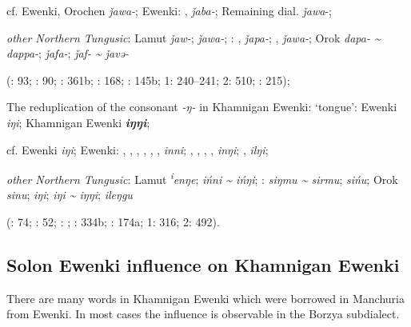 \documentclass[output=paper,colorlinks,citecolor=brown]{langscibook}
\begin{document}
    cf.  Ewenki, Orochen \textit{ǰawa-};  Ewenki: ,  \textit{ǰaba-}; Remaining dial. \textit{ǰawa}{}-;

    \textit{other Northern Tungusic}: Lamut \textit{ǰaw-};  \textit{ǰawa-}; \textit{}: ,  \textit{ǰapa-}; ,  \textit{ǰawa-}; Orok \textit{dapa- {\textasciitilde} dappa-};  \textit{ǰafa-};  \textit{ǰaf- {\textasciitilde} ǰavǝ-}
    
    (\citealt{Castrén1856}: 93; \citealt{Janhunen1991}: 90; \citealt{Dorji1998}: 361b; \citealt{Chaoke2014a}: 168; \citealt{Vasilevic1958}: 145b; \citealt{Cincius1975B} 1: 240--241; \citealt{Hauer1952} 2: 510; \citealt{Zikmundová2013a}: 215);
\z
\z

\ea
The reduplication of the consonant \textit{-ŋ-} in Khamnigan Ewenki:
\ea ‘tongue’:  Ewenki \textit{iŋi}; Khamnigan Ewenki \textbf{\textit{iŋŋi}};

    cf.  Ewenki \textit{iŋi};  Ewenki: , , , , , ,  \textit{inni}; , , , ,  \textit{inŋi}; ,  \textit{ilŋi};

    \textit{other Northern Tungusic}: Lamut \textit{\textsuperscript{i}}\textit{enŋe};  \textit{ińni {\textasciitilde} ińŋi}; \textit{}:  \textit{siŋmu {\textasciitilde} sirmu};  \textit{sińu}; Orok \textit{sinu};  \textit{iŋi};  \textit{iŋi {\textasciitilde} iŋŋi};  \textit{ileŋgu}
    
    (\citealt{Castrén1856}: 74; \citealt{Janhunen1991}: 52; \citealt{Janhunen1991}: ; \citealt{Dorji1998}: 334b; \citealt{Vasilevic1958}: 174a; \citealt{Cincius1975B} 1: 316; \citealt{Hauer1952} 2: 492).
\z
\z


\subsection{Solon Ewenki influence on Khamnigan Ewenki}

There are many words in Khamnigan Ewenki which were borrowed in Manchuria from  Ewenki. In most cases the  influence is observable in the Borzya subdialect.
\end{document}
